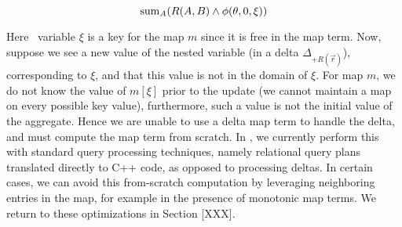 \[\mathrm{sum}_{A}(R(A,B)\wedge \phi(\theta, 0, \xi))\]


Here \bigsum\ variable $\xi$ is a key for the map $m$ since it is free in the
map term.
Now, suppose we see a new value of the nested variable (in a delta
$\Delta_{+R(\vec{r})}$), corresponding to $\xi$, and that this value is not in
the domain of $\xi$. For map $m$, we do not know the value of $m[\xi]$ prior to
the update (we cannot maintain a map on every possible key value), furthermore,
such a value is not the initial value of the aggregate. Hence we are unable to
use a delta map term to handle the delta, and must compute the map term from
scratch. In \compiler, we currently perform this with standard query processing
techniques, namely relational query plans translated directly to C++ code, as
opposed to processing deltas. In certain cases, we can avoid this from-scratch
computation by leveraging neighboring entries in the map, for example in the
presence of monotonic map terms. We return to these optimizations in Section
[XXX].


